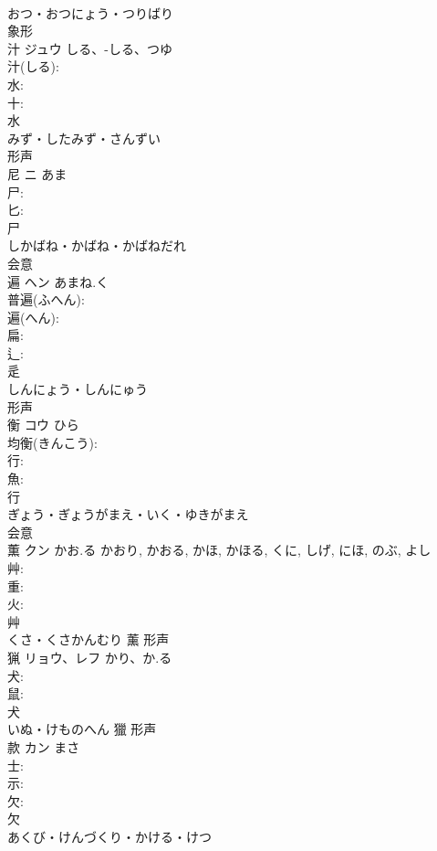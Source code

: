 \documentclass[8pt]{extreport}
\begin{document}
\begin{CJK}{UTF8}{min}
\\	おつ・おつにょう・つりばり	
\\	象形 
\\	汁	ジュウ	しる、-しる、つゆ		
\\	汁(しる): 
\\	水: 
\\	十: 
\\	水	
\\	みず・したみず・さんずい	
\\	形声 
\\	尼	ニ	あま		
\\	尸: 
\\	匕: 
\\	尸	
\\	しかばね・かばね・かばねだれ	
\\	会意 
\\	遍	ヘン	あまね.く		
\\	普遍(ふへん): 
\\	遍(へん): 
\\	扁: 
\\	辶: 
\\	辵	
\\	しんにょう・しんにゅう	
\\	形声 
\\	衡	コウ		ひら	
\\	均衡(きんこう): 
\\	行: 
\\	魚: 
\\	行	
\\	ぎょう・ぎょうがまえ・いく・ゆきがまえ	
\\	会意 
\\	薫	クン	かお.る	かおり, かおる, かほ, かほる, くに, しげ, にほ, のぶ, よし	
\\	艸: 
\\	重: 
\\	火: 
\\	艸	
\\	くさ・くさかんむり	薰	形声 
\\	猟	リョウ、レフ	かり、か.る		
\\	犬: 
\\	鼠: 
\\	犬	
\\	いぬ・けものへん	獵	形声 
\\	款	カン		まさ	
\\	士: 
\\	示: 
\\	欠: 
\\	欠	
\\	あくび・けんづくり・かける・けつ	

\end{CJK}
\end{document}

